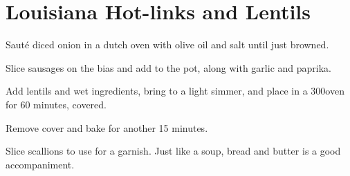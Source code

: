 
\section{Louisiana Hot-links and Lentils}
\begin{recipe}


Sauté diced onion in a dutch oven with olive oil and salt until just browned.


Slice sausages on the bias and add to the pot, along with garlic and paprika.


Add lentils and wet ingredients, bring to a light simmer, and place in a
300\degree oven for 60 minutes, covered.


Remove cover and bake for another 15 minutes.


Slice scallions to use for a garnish. Just like a soup, bread and butter is a
good accompaniment.

\end{recipe}
